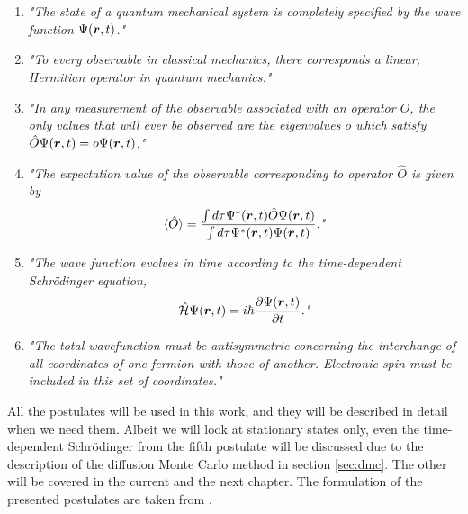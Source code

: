 \begin{enumerate}
	\item \textit{"The state of a quantum mechanical system is completely specified by the wave function $\Psi(\boldsymbol{{r}},t)$."}
	
	\item \textit{"To every observable in classical mechanics, there corresponds a linear, Hermitian operator in quantum mechanics."}
	
	\item \textit{"In any measurement of the observable associated with an operator $\hat{O}$, the only values that will ever be observed are the eigenvalues $o$ which satisfy $\hat{O}\Psi(\boldsymbol{{r}},t)=o\Psi(\boldsymbol{{r}},t)$."}
	
	\item \textit{"The expectation value of the observable corresponding to operator $\hat{O}$ is given by
		$$\langle\hat{O}\rangle=\frac{\int d\tau\Psi^*(\boldsymbol{{r}},t)\hat{O}\Psi(\boldsymbol{{r}},t)}{\int d\tau\Psi^*(\boldsymbol{{r}},t)\Psi(\boldsymbol{{r}},t)}.\textit{"}$$}
	
	\item \textit{"The wave function evolves in time according to the time-dependent Schrödinger equation,
		$$\hat{\mathcal{H}}\Psi(\boldsymbol{{r}},t)=i\hbar\frac{\partial\Psi(\boldsymbol{{r}},t)}{\partial t}.\textit{"}$$}
	
	\item \textit{"The total wavefunction must be antisymmetric concerning the interchange of all coordinates of one fermion with those of another. Electronic spin must be included in this set of coordinates."} 
\end{enumerate}
All the postulates will be used in this work, and they will be described in detail when we need them. Albeit we will look at stationary states only, even the time-dependent Schrödinger from the fifth postulate will be discussed due to the description of the diffusion Monte Carlo method in section \ref{sec:dmc}. The other will be covered in the current and the next chapter. The formulation of the presented postulates are taken from \cite{sherrill_david_postulates_2003}.

